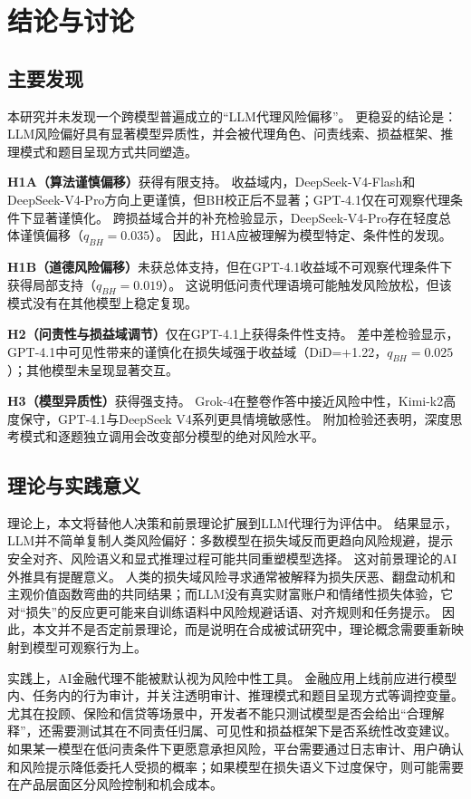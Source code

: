 \section{结论与讨论}

\subsection{主要发现}

本研究并未发现一个跨模型普遍成立的“LLM代理风险偏移”。
更稳妥的结论是：LLM风险偏好具有显著模型异质性，并会被代理角色、问责线索、损益框架、推理模式和题目呈现方式共同塑造。

\textbf{H1A（算法谨慎偏移）}获得有限支持。
收益域内，DeepSeek-V4-Flash和DeepSeek-V4-Pro方向上更谨慎，但BH校正后不显著；GPT-4.1仅在可观察代理条件下显著谨慎化。
跨损益域合并的补充检验显示，DeepSeek-V4-Pro存在轻度总体谨慎偏移（$q_{BH}=0.035$）。
因此，H1A应被理解为模型特定、条件性的发现。

\textbf{H1B（道德风险偏移）}未获总体支持，但在GPT-4.1收益域不可观察代理条件下获得局部支持（$q_{BH}=0.019$）。
这说明低问责代理语境可能触发风险放松，但该模式没有在其他模型上稳定复现。

\textbf{H2（问责性与损益域调节）}仅在GPT-4.1上获得条件性支持。
差中差检验显示，GPT-4.1中可见性带来的谨慎化在损失域强于收益域（DiD=+1.22，$q_{BH}=0.025$）；其他模型未呈现显著交互。

\textbf{H3（模型异质性）}获得强支持。
Grok-4在整卷作答中接近风险中性，Kimi-k2高度保守，GPT-4.1与DeepSeek V4系列更具情境敏感性。
附加检验还表明，深度思考模式和逐题独立调用会改变部分模型的绝对风险水平。

\subsection{理论与实践意义}

理论上，本文将替他人决策和前景理论扩展到LLM代理行为评估中。
结果显示，LLM并不简单复制人类风险偏好：多数模型在损失域反而更趋向风险规避，提示安全对齐、风险语义和显式推理过程可能共同重塑模型选择。
这对前景理论的AI外推具有提醒意义。
人类的损失域风险寻求通常被解释为损失厌恶、翻盘动机和主观价值函数弯曲的共同结果；而LLM没有真实财富账户和情绪性损失体验，它对“损失”的反应更可能来自训练语料中风险规避话语、对齐规则和任务提示。
因此，本文并不是否定前景理论，而是说明在合成被试研究中，理论概念需要重新映射到模型可观察行为上。

实践上，AI金融代理不能被默认视为风险中性工具。
金融应用上线前应进行模型内、任务内的行为审计，并关注透明审计、推理模式和题目呈现方式等调控变量。
尤其在投顾、保险和信贷等场景中，开发者不能只测试模型是否会给出“合理解释”，还需要测试其在不同责任归属、可见性和损益框架下是否系统性改变建议。
如果某一模型在低问责条件下更愿意承担风险，平台需要通过日志审计、用户确认和风险提示降低委托人受损的概率；如果模型在损失语义下过度保守，则可能需要在产品层面区分风险控制和机会成本。

